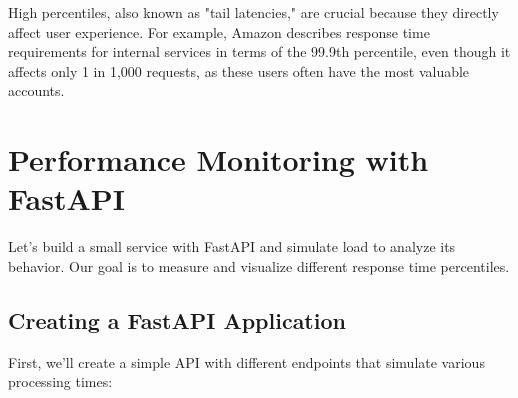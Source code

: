 \documentclass[12pt,letterpaper]{article}
\begin{document}
High percentiles, also known as "tail latencies," are crucial because they directly affect user experience. For example, Amazon describes response time requirements for internal services in terms of the 99.9th percentile, even though it affects only 1 in 1,000 requests, as these users often have the most valuable accounts.

\section{Performance Monitoring with FastAPI}

Let's build a small service with FastAPI and simulate load to analyze its behavior. Our goal is to measure and visualize different response time percentiles.

\subsection{Creating a FastAPI Application}

First, we'll create a simple API with different endpoints that simulate various processing times:
\end{document}
